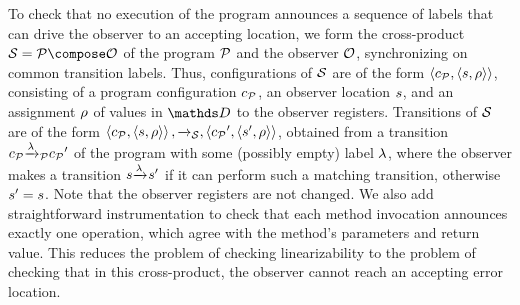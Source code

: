 To check that no execution of the program announces a sequence of labels that
can drive the observer to an accepting location, we form
the cross-product $\system=\prog\compose\observer$ of the program ${\mathcal P}$
and the observer ${\mathcal O}$, synchronizing on common transition labels.
Thus, configurations of ${\mathcal S}$ are of the form
$\left\langle c_{{\mathcal P}},\left\langle s,\rho\right\rangle\right\rangle$, consisting of a program configuration
$c_{{\mathcal P}}$, an observer location $s$, and an assignment $\rho$ of values
in $\ddomain$ to the observer registers.
Transitions of ${\mathcal S}$ are of the form
$\left\langle c_{{\mathcal P}},\left\langle s,\rho\right\rangle\right\rangle,{\xrightarrow{}{}}_{\!\!{\mathcal S}},\left\langle{c_{{\mathcal P}}}',\left\langle s',\rho\right\rangle\right\rangle$,
obtained from a transition
$c_{{\mathcal P}} {\xrightarrow{\lambda}{}}_{\!\!{\mathcal P}} {c_{{\mathcal P}}}'$ of the program with some (possibly empty)
label $\lambda$, where the observer makes a transition
$s {\xrightarrow{\lambda}{}}_{\!\!} {s}'$ if it can perform such a matching
transition, otherwise $s' = s$.
Note that the observer registers are not changed.
We also add straightforward instrumentation to check that
each method invocation announces exactly one operation, which
agree with the method's parameters and return value.
This reduces the
problem of checking linearizability to the problem of checking that
in this cross-product, the observer cannot reach an accepting error location.

%




